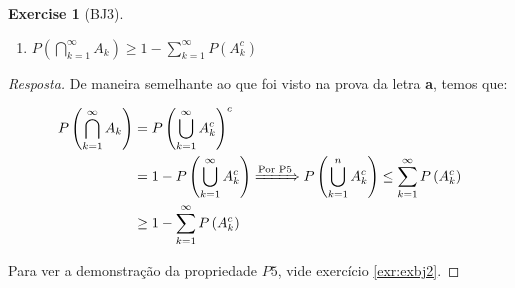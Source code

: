 \documentclass[
]{article}
\providecommand{\tightlist}{%
  \setlength{\itemsep}{0pt}\setlength{\parskip}{0pt}}
\theoremstyle{definition}
\theoremstyle{definition}
\theoremstyle{definition}
\newtheorem{exercise}{Exercise}[section]
\theoremstyle{definition}
\theoremstyle{remark}
\begin{document}
\begin{exercise}[BJ3]
\begin{enumerate}
\def\labelenumi{\alph{enumi})}
\setcounter{enumi}{2}
\tightlist
\item
  \(P\left(\bigcap_{k=1}^{\infty}A_{k}\right) \ge 1 - \sum_{k=1}^{\infty}P(A_{k}^{c})\)
\end{enumerate}

\begin{proof}[Resposta]
De maneira semelhante ao que foi visto na prova da letra \textbf{a}, temos que:

\begin{align*}
P\left(\bigcap_{k=1}^{\infty}A_{k}\right) &= P\left(\bigcup_{k=1}^{\infty}A_{k}^{c}\right)^{c} \\
&= 1 - P\left(\bigcup_{k=1}^{\infty}A_{k}^{c}\right) \xRightarrow[]{\text{Por P5}} P\left(\bigcup_{k=1}^{n}A_{k}^{c}\right) \le \sum_{k=1}^{\infty}P\left(A_{k}^{c}\right) \\
&\ge 1 - \sum_{k=1}^{\infty}P\left(A_{k}^{c}\right)
\end{align*}

Para ver a demonstração da propriedade \(P5\), vide exercício \ref{exr:exbj2}.
\end{proof}

\end{exercise}
\end{document}
